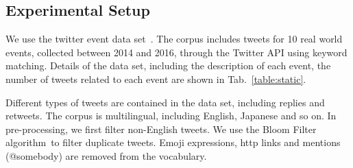 \documentclass[envcountsame]{llncs}
\begin{document}
\subsection{Experimental Setup}
We use the twitter event data set~\cite{ZubiagaTwitterDatasets}. The corpus includes tweets for 10 real world events, collected between 2014 and 2016, through the Twitter API using keyword matching. Details of the data set, including the description of each event, the number of tweets related to each event are shown in Tab.~\ref{table:static}.


Different types of tweets are contained in the data set, including replies and retweets. The corpus is multilingual, including English, Japanese and so on.
In pre-processing, we first filter non-English tweets. We use the Bloom Filter algorithm~\cite{BloomFilter}to filter duplicate tweets. Emoji expressions, http links and mentions (@somebody) are removed from the vocabulary.
\end{document}
